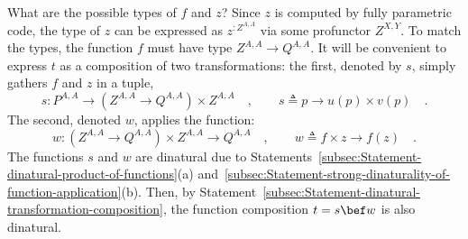 What are the possible types of $f$ and $z$? Since $z$ is computed
by fully parametric code, the type of $z$ can be expressed as $z^{:Z^{A,A}}$
via some profunctor $Z^{X,Y}$. To match the types, the function $f$
must have type $Z^{A,A}\rightarrow Q^{A,A}$. It will be convenient
to express $t$ as a composition of two transformations: the first,
denoted by $s$, simply gathers $f$ and $z$ in a tuple,
\[
s:P^{A,A}\rightarrow(Z^{A,A}\rightarrow Q^{A,A})\times Z^{A,A}\quad,\quad\quad s\triangleq p\rightarrow u(p)\times v(p)\quad.
\]
The second, denoted $w$, applies the function:
\[
w:(Z^{A,A}\rightarrow Q^{A,A})\times Z^{A,A}\rightarrow Q^{A,A}\quad,\quad\quad w\triangleq f\times z\rightarrow f(z)\quad.
\]
The functions $s$ and $w$ are dinatural due to Statements~\ref{subsec:Statement-dinatural-product-of-functions}(a)
and~\ref{subsec:Statement-strong-dinaturality-of-function-application}(b).
Then, by Statement~\ref{subsec:Statement-dinatural-transformation-composition},
the function composition $t=s\bef w$ is also dinatural. %
